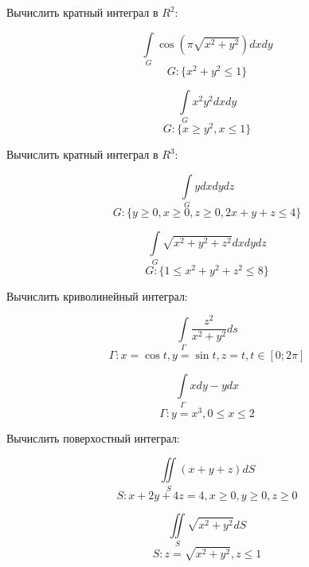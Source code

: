 \documentclass[russian]{article}
\begin{document}
 
Вычислить кратный интеграл в $R^2$:

$$\int\limits_{G} \cos(\pi\sqrt{x^2 + y^2}) dxdy$$
$$G: \{x^2 + y^2 \le 1\}$$

$$\int\limits_{G} x^2 y^2 dxdy$$
$$G: \{x \ge y^2, x \le 1\}$$


Вычислить кратный интеграл в $R^3$:

$$\int\limits_{G} y dx dy dz$$
$$G: \{y \ge 0, x \ge 0, z \ge 0, 2x + y + z \le 4 \}$$

$$\int\limits_{G} \sqrt{x^2 + y^2 + z^2} dx dy dz$$
$$G: \{ 1 \le x^2 + y^2 + z^2 \le 8\}$$


Вычислить криволинейный интеграл:

$$\int\limits_{\Gamma} \frac{z^2}{x^2 + y^2} ds$$
$$\Gamma: x = \cos t, y = \sin t, z = t, t \in [0; 2\pi]$$

$$\int\limits_{\Gamma} x dy - y dx$$
$$\Gamma: y = x^3, 0 \le x \le 2$$


Вычислить поверхостный интеграл:

$$\iint\limits_S (x + y + z) dS$$
$$S: x + 2y + 4z = 4, x \ge 0, y \ge 0, z \ge 0$$

$$\iint\limits_S \sqrt{x^2 + y^2} dS$$
$$S: z = \sqrt{x^2 + y^2}, z \le 1$$
 
\end{document}
